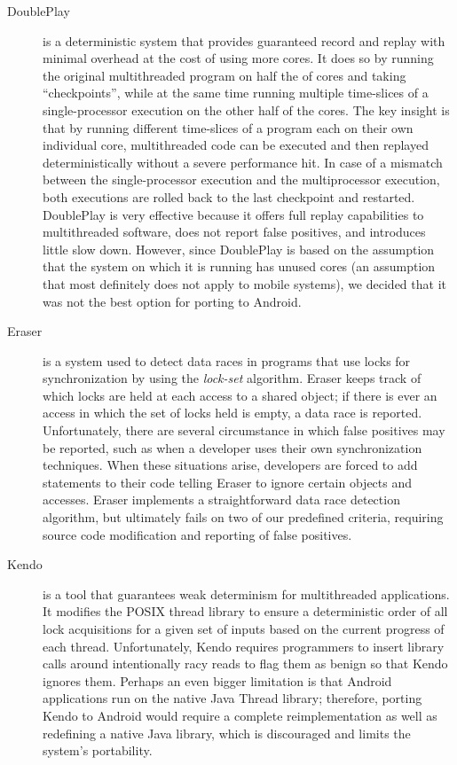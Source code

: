 \documentclass{acm_proc_article-sp}
\begin{document}
\begin{description}
\item[DoublePlay] \cite{Veeraraghavan2012} is a deterministic system that provides guaranteed record and replay with minimal overhead at the cost of using more cores.  It does so by running the original multithreaded program on half the of cores and taking ``checkpoints'', while at the same time running multiple time-slices of a single-processor execution on the other half of the cores. The key insight is that by running different time-slices of a program each on their own individual core, multithreaded code can be executed and then replayed deterministically without a severe performance hit. In case of a mismatch between the single-processor execution and the multiprocessor execution, both executions are rolled back to the last checkpoint and restarted. DoublePlay is very effective because it offers full replay capabilities to multithreaded software, does not report false positives, and introduces little slow down. However, since DoublePlay is based on the assumption that the system on which it is running has unused cores (an assumption that most definitely does not apply to mobile systems), we decided that it was not the best option for porting to Android. 

\item[Eraser] \cite{Savage1997} is a system used to detect data races in programs that use locks for synchronization by using the \emph{lock-set} algorithm. Eraser keeps track of which locks are held at each access to a shared object; if there is ever an access in which the set of locks held is empty, a data race is reported. Unfortunately, there are several circumstance in which false positives may be reported, such as when a developer uses their own synchronization techniques. When these situations arise, developers are forced to add statements to their code telling Eraser to ignore certain objects and accesses. Eraser implements a straightforward data race detection algorithm, but ultimately fails on two of our predefined criteria, requiring source code modification and reporting of false positives.


\item[Kendo]  \cite{Olszewski2009} is a tool that guarantees weak determinism for multithreaded applications. It modifies the POSIX thread library to ensure a deterministic order of all lock acquisitions for a given set of inputs based on the current progress of each thread. Unfortunately, Kendo requires programmers to insert library calls around intentionally racy reads to flag them as benign so that Kendo ignores them. Perhaps an even bigger limitation is that Android applications run on the native Java Thread library; therefore, porting Kendo to Android would require a complete reimplementation as well as redefining a native Java library, which is discouraged and limits the system's portability.



\end{description}
\end{document}
